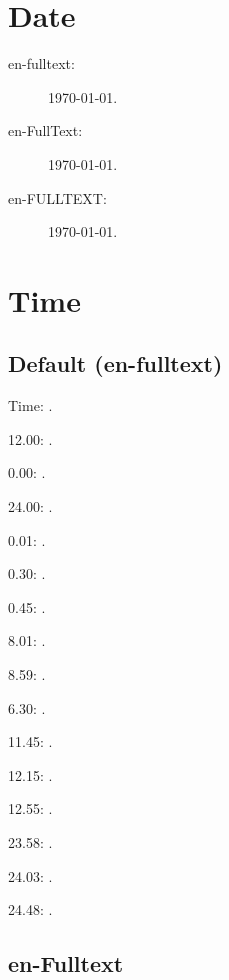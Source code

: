 \documentclass{article}
\begin{document}
\section{Date}

\begin{description}
\item[en-fulltext:]
\today.

\item[en-FullText:]
\today.

\item[en-FULLTEXT:]
\today.
\end{description}

\section{Time}
\subsection{Default (en-fulltext)}

Time: \DTMcurrenttime.

12.00: .

0.00: .

24.00: .

0.01: .

0.30: .

0.45: .

8.01: .

8.59: .

6.30: .

11.45: .

12.15: .

12.55: .

23.58: .

24.03: .

24.48: .

\subsection{en-Fulltext}
\end{document}
